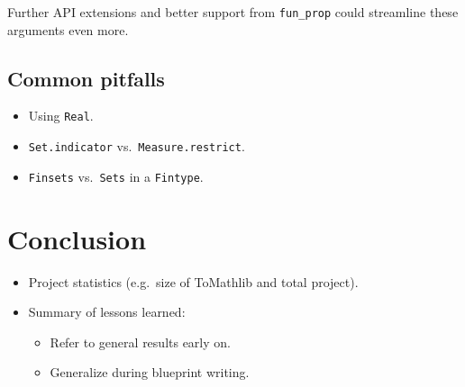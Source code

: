\documentclass[12pt]{amsart}
\begin{document}
Further API extensions and better support from \texttt{fun\_prop} could streamline these arguments even more.


\subsection{Common pitfalls}\label{subsec:pitfalls}
\begin{itemize}
  \item Using \texttt{Real}.
  \item \texttt{Set.indicator} vs.\ \texttt{Measure.restrict}.
  \item \texttt{Finsets} vs.\ \texttt{Sets} in a \texttt{Fintype}.
\end{itemize}


\section{Conclusion}\label{sec:conclusion}
\begin{itemize}
  \item Project statistics (e.g.\ size of ToMathlib and total project).
  \item Summary of lessons learned:
    \begin{itemize}
      \item Refer to general results early on.
      \item Generalize during blueprint writing.
    \end{itemize}
\end{itemize}

%
%
\printbibliography
\end{document}
